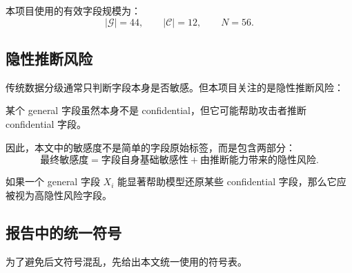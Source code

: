 \documentclass[UTF8]{ctexart}
\begin{document}
本项目使用的有效字段规模为：
\[
|\mathcal{G}|=44,\qquad |\mathcal{C}|=12,\qquad N=56.
\]

\subsection{隐性推断风险}

传统数据分级通常只判断字段本身是否敏感。但本项目关注的是隐性推断风险：

\begin{center}
某个 general 字段虽然本身不是 confidential，但它可能帮助攻击者推断 confidential 字段。
\end{center}

因此，本文中的敏感度不是简单的字段原始标签，而是包含两部分：
\[
\text{最终敏感度}
=
\text{字段自身基础敏感性}
+
\text{由推断能力带来的隐性风险}.
\]

如果一个 general 字段 \(X_i\) 能显著帮助模型还原某些 confidential 字段，那么它应被视为高隐性风险字段。

\subsection{报告中的统一符号}

为了避免后文符号混乱，先给出本文统一使用的符号表。
\end{document}
